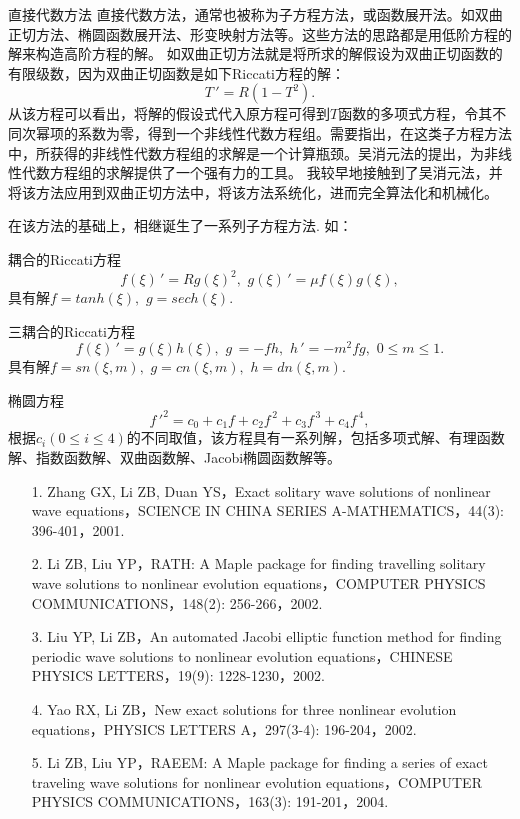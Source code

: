 \documentclass{beamer}
\begin{document}
\begin{frame}{直接代数方法}
直接代数方法，通常也被称为子方程方法，或函数展开法。如双曲正切方法、椭圆函数展开法、形变映射方法等。这些方法的思路都是用低阶方程的解来构造高阶方程的解。
如双曲正切方法就是将所求的解假设为双曲正切函数的有限级数，因为双曲正切函数是如下Riccati方程的解：
\[
   T\,'=R(1-T^2).  
\]
从该方程可以看出，将解的假设式代入原方程可得到$T$函数的多项式方程，令其不同次幂项的系数为零，得到一个非线性代数方程组。需要指出，在这类子方程方法中，所获得的非线性代数方程组的求解是一个计算瓶颈。吴消元法的提出，为非线性代数方程组的求解提供了一个强有力的工具。
我较早地接触到了吴消元法，并将该方法应用到双曲正切方法中，将该方法系统化，进而完全算法化和机械化。
\end{frame}
\begin{frame}
  在该方法的基础上，相继诞生了一系列子方程方法. 如： 
  
  耦合的Riccati方程
  \[
    f(\xi)\,'=Rg(\xi)^2,\,\,g(\xi)\,'=\mu f(\xi) g(\xi),
  \]
  具有解$f=tanh(\xi),\,\,g=sech(\xi)$. 
 
  三耦合的Riccati方程
  \[
    f(\xi)\,'=g(\xi)h(\xi),\,\,g\,=-fh,\,\,h\,'=-m^2fg,\,\, 0\leq m \leq 1.
  \]
  具有解$f=sn(\xi,m),\,\,g=cn(\xi,m),\,\,h=dn(\xi,m).$
  
  椭圆方程
  \[
      {f\,'}^2=c_0+c_1 f +c_2 f^{\,2}+c_3f^{\,3}+c_4f^{\,4},  
  \]
  根据$c_i(0 \le i \le 4)$的不同取值，该方程具有一系列解，包括多项式解、有理函数解、指数函数解、双曲函数解、Jacobi椭圆函数解等。
\end{frame}
\begin{frame}
 \begin{itemize}
  \item[1.] Zhang GX, Li ZB, Duan YS，Exact solitary wave solutions of nonlinear wave equations，SCIENCE IN CHINA SERIES A-MATHEMATICS，44(3): 396-401，2001.
  \item[2.] Li ZB, Liu YP，RATH: A Maple package for finding travelling solitary wave solutions to nonlinear evolution equations，COMPUTER PHYSICS COMMUNICATIONS，148(2): 256-266，2002.
  \item[3.] Liu YP, Li ZB，An automated Jacobi elliptic function method for finding periodic wave solutions to nonlinear evolution equations，CHINESE PHYSICS LETTERS，19(9): 1228-1230，2002.
  \item[4.] Yao RX, Li ZB，New exact solutions for three nonlinear evolution equations，PHYSICS LETTERS A，297(3-4): 196-204，2002.
  \item[5.] Li ZB, Liu YP，RAEEM: A Maple package for finding a series of exact traveling wave solutions for nonlinear evolution equations，COMPUTER PHYSICS COMMUNICATIONS，163(3): 191-201，2004.
 \end{itemize}
\end{frame}
\end{document}
